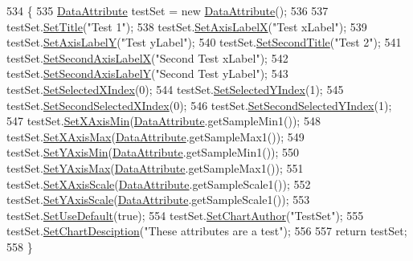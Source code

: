 \begin{DoxyCode}
534                                                        \{
535         \hyperlink{class_data_attribute}{DataAttribute} testSet = \textcolor{keyword}{new} \hyperlink{class_data_attribute_a1a29077565a68ace7830697014c898d1}{DataAttribute}();
536         
537         testSet.\hyperlink{class_data_attribute_a434e57b34476663c13eb6dc37ef05cd2}{SetTitle}(\textcolor{stringliteral}{"Test 1"});
538         testSet.\hyperlink{class_data_attribute_a2d8c2f41d2847e3bbcb8b869d15e97f3}{SetAxisLabelX}(\textcolor{stringliteral}{"Test xLabel"});
539         testSet.\hyperlink{class_data_attribute_a31655976e5ce4d6be0b07b0a0bdcf3fc}{SetAxisLabelY}(\textcolor{stringliteral}{"Test yLabel"});
540         testSet.\hyperlink{class_data_attribute_ab7c3ae470051e011aa22725ad9ebab58}{SetSecondTitle}(\textcolor{stringliteral}{"Test 2"});
541         testSet.\hyperlink{class_data_attribute_a0749b154967281fc88c3d50b61b82ec7}{SetSecondAxisLabelX}(\textcolor{stringliteral}{"Second Test xLabel"});
542         testSet.\hyperlink{class_data_attribute_aa991ca454981460ff011efa92a63b83c}{SetSecondAxisLabelY}(\textcolor{stringliteral}{"Second Test yLabel"});
543         testSet.\hyperlink{class_data_attribute_af3501ac788c06132211c36fd6655ec6c}{SetSelectedXIndex}(0);
544         testSet.\hyperlink{class_data_attribute_a444715eaafbe1340988daf35860754f4}{SetSelectedYIndex}(1);
545         testSet.\hyperlink{class_data_attribute_afb6eab1f1b118109a5241e1a1693a0ad}{SetSecondSelectedXIndex}(0);
546         testSet.\hyperlink{class_data_attribute_a89b55444718059d538f3e0ad7d9b8461}{SetSecondSelectedYIndex}(1);
547         testSet.\hyperlink{class_data_attribute_acd1994e216d21da1f3e7ea2819145fe9}{SetXAxisMin}(\hyperlink{class_data_attribute}{DataAttribute}.getSampleMin1());
548         testSet.\hyperlink{class_data_attribute_a6aedbe05a82f23d6abca00f8b85bf1ff}{SetXAxisMax}(\hyperlink{class_data_attribute}{DataAttribute}.getSampleMax1());
549         testSet.\hyperlink{class_data_attribute_afacd93a87dbe8ed03d4dc9a50e44851f}{SetYAxisMin}(\hyperlink{class_data_attribute}{DataAttribute}.getSampleMin1());
550         testSet.\hyperlink{class_data_attribute_a0098d5256a1b929cf8a84006bb52d1af}{SetYAxisMax}(\hyperlink{class_data_attribute}{DataAttribute}.getSampleMax1());
551         testSet.\hyperlink{class_data_attribute_ad70067aa2addb581e5d654d1cee4cd97}{SetXAxisScale}(\hyperlink{class_data_attribute}{DataAttribute}.getSampleScale1());
552         testSet.\hyperlink{class_data_attribute_a56bf007539747ac6b80c156416336d14}{SetYAxisScale}(\hyperlink{class_data_attribute}{DataAttribute}.getSampleScale1());
553         testSet.\hyperlink{class_data_attribute_a46b8473768d9ba3609e5f5994e903a7c}{SetUseDefault}(\textcolor{keyword}{true});
554         testSet.\hyperlink{class_data_attribute_ae2965e7960aaf72643f23a1359daf582}{SetChartAuthor}(\textcolor{stringliteral}{"TestSet"});
555         testSet.\hyperlink{class_data_attribute_abbc4a01ce590f81351c3bb527cf18352}{SetChartDesciption}(\textcolor{stringliteral}{"These attributes are a test"});
556         
557         \textcolor{keywordflow}{return} testSet;
558     \}
\end{DoxyCode}
